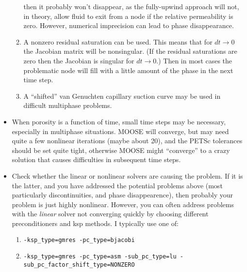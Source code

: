 \documentclass[]{scrreprt}
\begin{document}
\begin{itemize}
\begin{enumerate}
  then it probably won't disappear, as the fully-upwind approach will
  not, in theory, allow fluid to exit from a node if the relative
  permeability is zero.  However, numerical imprecision can lead to
  phase disappearance.
\item A nonzero residual saturation can be used.  This means that for
  $dt\rightarrow 0$ the Jacobian matrix will be nonsingular.  (If the
  residual saturations are zero then the Jacobian is singular for
  $dt\rightarrow 0$.)  Then in most cases the problematic node will
  fill with a little amount of the phase in the next time step.
\item A ``shifted'' van Genuchten capillary suction curve may be used
  in difficult multiphase problems.
\end{enumerate}
\item When porosity is a function of time, small time steps may be
  necessary, especially in multiphase situations.  MOOSE will
  converge, but may need quite a few nonlinear iterations (maybe about
  20), and the PETSc tolerances should be set quite tight, otherwise
  MOOSE might ``converge'' to a crazy solution that causes
  difficulties in subsequent time steps.
\item Check whether the linear or nonlinear solvers are causing the
  problem.  If it is the latter, and you have addressed the potential
  problems above (most particularly discontinuities, and phase
  disappearence), then probably your problem is just highly
  nonlinear.  However, you can often address problems with the
  {\em linear} solver not converging quickly by choosing different
  preconditioners and ksp methods.  I typically use one of:
\begin{enumerate}
\item {\tt -ksp\_type=gmres -pc\_type=bjacobi}
\item {\tt -ksp\_type=gmres -pc\_type=asm -sub\_pc\_type=lu -sub\_pc\_factor\_shift\_type=NONZERO}
\end{enumerate}
\end{itemize}
\end{document}
